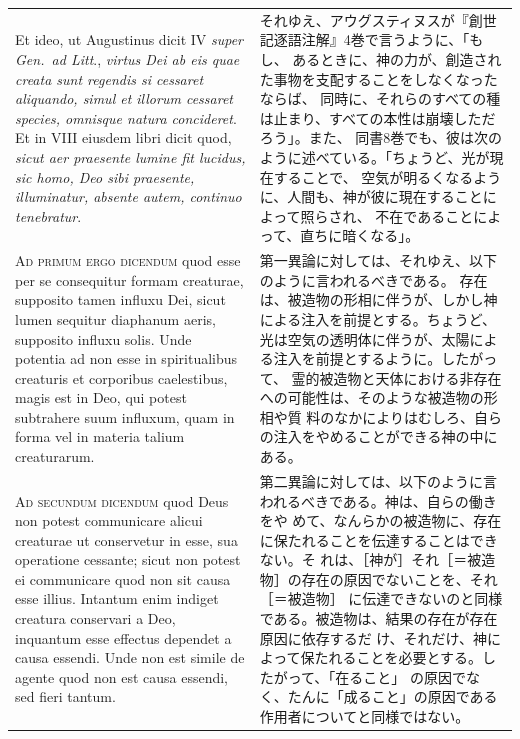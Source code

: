 \documentclass[paper=a4paper,fontsize=10pt,jafontsize=9pt,titlepage]{jlreq}
\begin{document}
\begin{longtable}{p{21em}p{21em}}
\\


Et ideo, ut
Augustinus dicit IV {\itshape super Gen.~ad Litt}., {\itshape virtus Dei ab eis quae creata
sunt regendis si cessaret aliquando, simul et illorum cessaret species,
omnisque natura concideret}. Et in VIII eiusdem libri dicit quod, {\itshape sicut
aer praesente lumine fit lucidus, sic homo, Deo sibi praesente,
illuminatur, absente autem, continuo tenebratur}.

&

それゆえ、アウグスティヌスが『創世記逐語注解』4巻で言うように、「もし、
 あるときに、神の力が、創造された事物を支配することをしなくなったならば、
同時に、それらのすべての種は止まり、すべての本性は崩壊しただろう」。また、
 同書8巻でも、彼は次のように述べている。「ちょうど、光が現在することで、
 空気が明るくなるように、人間も、神が彼に現在することによって照らされ、
 不在であることによって、直ちに暗くなる」。


\\


{\scshape Ad primum ergo dicendum} quod esse per se
consequitur formam creaturae, supposito tamen influxu Dei, sicut lumen
sequitur diaphanum aeris, supposito influxu solis. Unde potentia ad non
esse in spiritualibus creaturis et corporibus caelestibus, magis est in
Deo, qui potest subtrahere suum influxum, quam in forma vel in materia
talium creaturarum.

&

第一異論に対しては、それゆえ、以下のように言われるべきである。
存在は、被造物の形相に伴うが、しかし神による注入を前提とする。ちょうど、
 光は空気の透明体に伴うが、太陽による注入を前提とするように。したがって、
 霊的被造物と天体における非存在への可能性は、そのような被造物の形相や質
 料のなかによりはむしろ、自らの注入をやめることができる神の中にある。


\\


{\scshape Ad secundum dicendum} quod Deus non potest
communicare alicui creaturae ut conservetur in esse, sua operatione
cessante; sicut non potest ei communicare quod non sit causa esse
illius. Intantum enim indiget creatura conservari a Deo, inquantum esse
effectus dependet a causa essendi. Unde non est simile de agente quod
non est causa essendi, sed fieri tantum.

&

第二異論に対しては、以下のように言われるべきである。神は、自らの働きをや
めて、なんらかの被造物に、存在に保たれることを伝達することはできない。そ
れは、［神が］それ［＝被造物］の存在の原因でないことを、それ［＝被造物］
に伝達できないのと同様である。被造物は、結果の存在が存在原因に依存するだ
け、それだけ、神によって保たれることを必要とする。したがって、「在ること」
の原因でなく、たんに「成ること」の原因である作用者についてと同様ではない。


\end{longtable}
\end{document}

